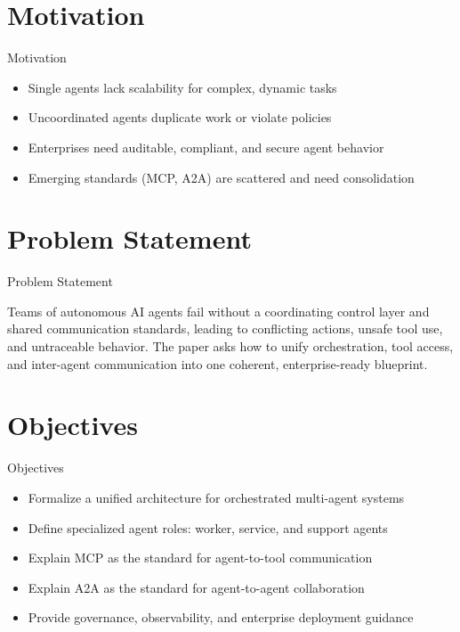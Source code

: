 \documentclass[10pt]{beamer}
\begin{document}
\section{Motivation}
\begin{frame}{Motivation}
\begin{itemize}
  \item Single agents lack scalability for complex, dynamic tasks
  \item Uncoordinated agents duplicate work or violate policies
  \item Enterprises need auditable, compliant, and secure agent behavior
  \item Emerging standards (MCP, A2A) are scattered and need consolidation
\end{itemize}
\end{frame}

\section{Problem Statement}
\begin{frame}{Problem Statement}
  \begin{block}{}
  Teams of autonomous AI agents fail without a coordinating control layer and shared communication standards, leading to conflicting actions, unsafe tool use, and untraceable behavior. The paper asks how to unify orchestration, tool access, and inter-agent communication into one coherent, enterprise-ready blueprint.
  \end{block}
\end{frame}

\section{Objectives}
\begin{frame}{Objectives}
\begin{itemize}
  \item Formalize a unified architecture for orchestrated multi-agent systems
  \item Define specialized agent roles: worker, service, and support agents
  \item Explain MCP as the standard for agent-to-tool communication
  \item Explain A2A as the standard for agent-to-agent collaboration
  \item Provide governance, observability, and enterprise deployment guidance
\end{itemize}
\end{frame}
\end{document}
